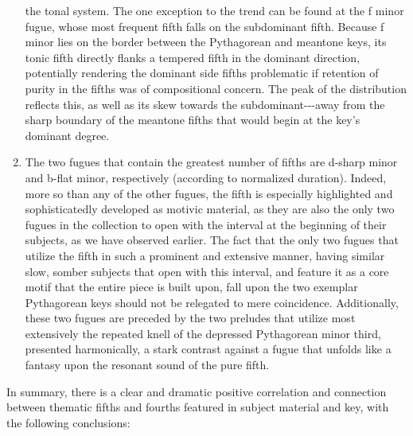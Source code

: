 \begin{enumerate}
  the tonal system. The one exception to the trend can be found at the f
  minor fugue, whose most frequent fifth falls on the subdominant fifth.
  Because f minor lies on the border between the Pythagorean and
  meantone keys, its tonic fifth directly flanks a tempered fifth in the
  dominant direction, potentially rendering the dominant side fifths
  problematic if retention of purity in the fifths was of compositional
  concern. The peak of the distribution reflects this, as well as its
  skew towards the subdominant-\/-\/-away from the sharp boundary of the
  meantone fifths that would begin at the key's dominant degree.
\item
  The two fugues that contain the greatest number of fifths are d-sharp
  minor and b-flat minor, respectively (according to normalized
  duration). Indeed, more so than any of the other fugues, the fifth is
  especially highlighted and sophisticatedly developed as motivic
  material, as they are also the only two fugues in the collection to
  open with the interval at the beginning of their subjects, as we have
  observed earlier. The fact that the only two fugues that utilize the
  fifth in such a prominent and extensive manner, having similar slow,
  somber subjects that open with this interval, and feature it as a core
  motif that the entire piece is built upon, fall upon the two exemplar
  Pythagorean keys should not be relegated to mere coincidence.
  Additionally, these two fugues are preceded by the two preludes that
  utilize most extensively the repeated knell of the depressed
  Pythagorean minor third, presented harmonically, a stark contrast
  against a fugue that unfolds like a fantasy upon the resonant sound of
  the pure fifth.
\end{enumerate}


    \begin{center}
    \end{center}
    

    \begin{center}
    \end{center}
    
    In summary, there is a clear and dramatic positive correlation and
connection between thematic fifths and fourths featured in subject
material and key, with the following conclusions:

